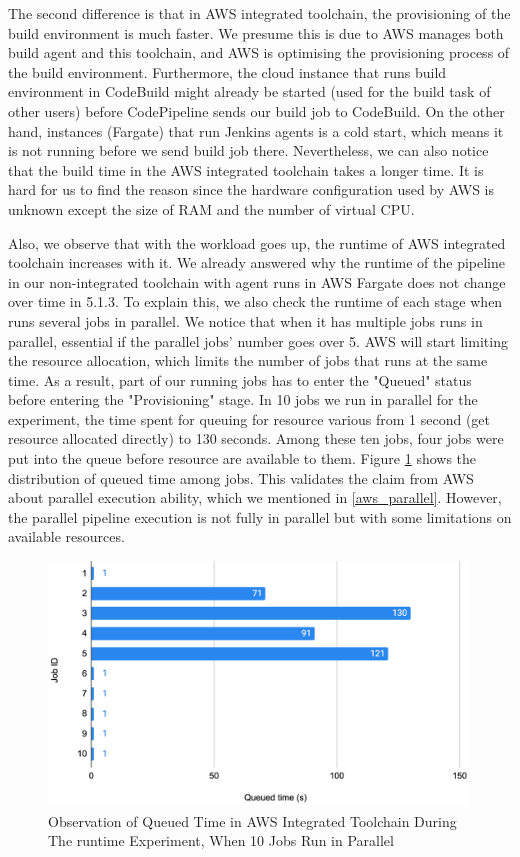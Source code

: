 \par
 The second difference is that in AWS integrated toolchain, the provisioning of the build environment is much faster. We presume this is due to AWS manages both build agent and this toolchain, and AWS is optimising the provisioning process of the build environment. Furthermore, the cloud instance that runs build environment in CodeBuild might already be started (used for the build task of other users) before CodePipeline sends our build job to CodeBuild. On the other hand, instances (Fargate) that run Jenkins agents is a cold start, which means it is not running before we send build job there.
 Nevertheless, we can also notice that the build time in the AWS integrated toolchain takes a longer time. It is hard for us to find the reason since the hardware configuration used by AWS is unknown except the size of RAM and the number of virtual CPU.
\par
 Also, we observe that with the workload goes up, the runtime of AWS integrated toolchain increases with it. We already answered why the runtime of the pipeline in our non-integrated toolchain with agent runs in AWS Fargate does not change over time in 5.1.3. To explain this, we also check the runtime of each stage when runs several jobs in parallel. We notice that when it has multiple jobs runs in parallel, essential if the parallel jobs' number goes over 5. AWS will start limiting the resource allocation, which limits the number of jobs that runs at the same time. As a result, part of our running jobs has to enter the "Queued" status before entering the "Provisioning" stage. In 10 jobs we run in parallel for the experiment, the time spent for queuing for resource various from 1 second (get resource allocated directly) to 130 seconds. Among these ten jobs, four jobs were put into the queue before resource are available to them. Figure \ref{fig:queued} shows the distribution of queued time among jobs. This validates the claim from AWS about parallel execution ability, which we mentioned in \ref{aws_parallel}. However, the parallel pipeline execution is not fully in parallel but with some limitations on available resources.
 \begin{figure}[!h]
  \centering
  \includegraphics[width=0.99\textwidth]{pics/queued_time.png}
  \caption{Observation of Queued Time in AWS Integrated Toolchain During The runtime Experiment, When 10 Jobs Run in Parallel}
  \label{fig:queued}
  \end{figure}
